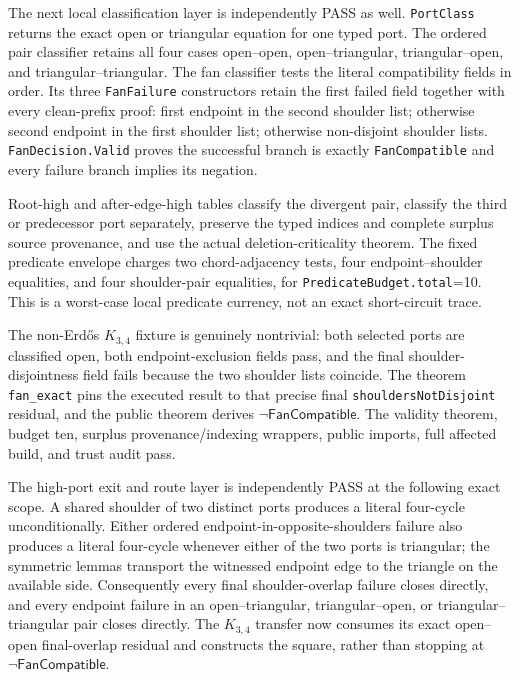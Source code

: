 \documentclass[11pt]{article}
\begin{document}
The next local classification layer is independently PASS as well.
\texttt{PortClass} returns the exact open or triangular equation for one typed
port.  The ordered pair classifier retains all four cases
open--open, open--triangular, triangular--open, and
triangular--triangular.  The fan classifier tests the literal compatibility
fields in order.  Its three \texttt{FanFailure} constructors retain the first
failed field together with every clean-prefix proof: first endpoint in the
second shoulder list; otherwise second endpoint in the first shoulder list;
otherwise non-disjoint shoulder lists.  \texttt{FanDecision.Valid} proves the
successful branch is exactly \texttt{FanCompatible} and every failure branch
implies its negation.

Root-high and after-edge-high tables classify the divergent pair, classify the
third or predecessor port separately, preserve the typed indices and complete
surplus source provenance, and use the actual deletion-criticality theorem.
The fixed predicate envelope charges two chord-adjacency tests, four
endpoint--shoulder equalities, and four shoulder-pair equalities, for
\texttt{PredicateBudget.total}=10.  This is a worst-case local predicate
currency, not an exact short-circuit trace.

The non-Erdős $K_{3,4}$ fixture is genuinely nontrivial: both selected ports
are classified open, both endpoint-exclusion fields pass, and the final
shoulder-disjointness field fails because the two shoulder lists coincide.
The theorem \texttt{fan\_exact} pins the executed result to that precise final
\texttt{shouldersNotDisjoint} residual, and the public theorem derives
$\neg\mathsf{FanCompatible}$.  The validity theorem, budget ten, surplus
provenance/indexing wrappers, public imports, full affected build, and trust
audit pass.

The high-port exit and route layer is independently PASS at the following
exact scope.  A shared shoulder of two distinct ports produces a literal
four-cycle unconditionally.  Either ordered endpoint-in-opposite-shoulders
failure also produces a literal four-cycle whenever either of the two ports is
triangular; the symmetric lemmas transport the witnessed endpoint edge to the
triangle on the available side.  Consequently every final shoulder-overlap
failure closes directly, and every endpoint failure in an open--triangular,
triangular--open, or triangular--triangular pair closes directly.  The
$K_{3,4}$ transfer now consumes its exact open--open final-overlap residual and
constructs the square, rather than stopping at
$\neg\mathsf{FanCompatible}$.
\end{document}
